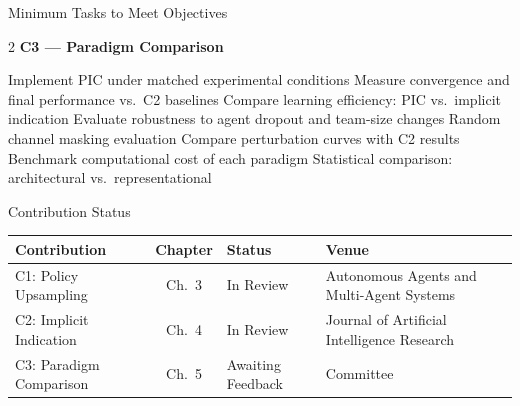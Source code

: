 \begin{frame}[shrink=7]{Minimum Tasks to Meet Objectives}
\begin{multicols}{2}
        \textbf{C3 — Paradigm Comparison}
        \begin{itemize}
            \chit Implement PIC under matched experimental conditions %
            \chit Measure convergence and final performance vs.\ C2 baselines %
            \chit Compare learning efficiency: PIC vs.\ implicit indication %
            \chit Evaluate robustness to agent dropout and team-size changes %
            \chit Random channel masking evaluation %
            \chit Compare perturbation curves with C2 results %
            \chit Benchmark computational cost of each paradigm %
            \chit Statistical comparison: architectural vs.\ representational %
        \end{itemize}
    \end{multicols}

\end{frame}


\begin{frame}{Contribution Status}
\vspace{0.5em}
\begin{center}
\renewcommand{\arraystretch}{1.6}
\begin{tabular}{@{} l c l l @{}}
    \toprule
    \textbf{Contribution} & \textbf{Chapter} & \textbf{Status} & \textbf{Venue} \\
    \midrule
    C1: Policy Upsampling      & Ch.\ 3 & In Review & Autonomous Agents and Multi-Agent Systems \\
    C2: Implicit Indication    & Ch.\ 4 & In Review & Journal of Artificial Intelligence Research \\
    C3: Paradigm Comparison    & Ch.\ 5 & Awaiting Feedback& Committee \\
    \bottomrule
\end{tabular}
\end{center}

\end{frame}


